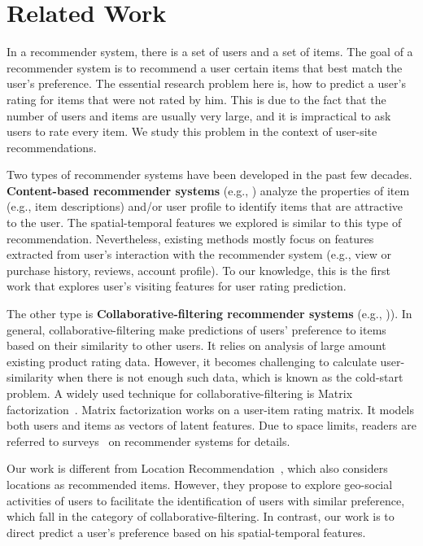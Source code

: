 
\section{Related Work}\label{sec:rw}

In a recommender system, there is a set of users and a set of items. The goal of a recommender system is to recommend a user certain items that best match the user's preference. The essential research problem here is, how to predict a user's rating for items that were not rated by him. This is due to the fact that the number of users and items are usually very large, and it is impractical to ask users to rate every item. We study this problem in the context of user-site recommendations.

Two types of recommender systems have been developed in the past few decades. \textbf{Content-based recommender systems} (e.g., \cite{contentbasedLang95,contentbasedPazzani97}) analyze the properties of item (e.g., item descriptions) and/or user profile to identify items that are attractive to the user. The spatial-temporal features we explored is similar to this type of recommendation. Nevertheless, existing methods mostly focus on features extracted from user's interaction with the recommender system (e.g., view or purchase history, reviews, account profile). To our knowledge, this is the first work that explores user's visiting features for user rating prediction. 

The other type is \textbf{Collaborative-filtering recommender systems} (e.g., \cite{userUserRec94,amazonRecommendation,davidson2010youtube,MFRec09})). In general, collaborative-filtering make predictions of users' preference to items based on their similarity to other users. It relies on analysis of large amount existing product rating data. However, it becomes challenging to calculate user-similarity when there is not enough such data, which is known as the cold-start problem. A widely used technique for collaborative-filtering is Matrix factorization~\cite{koren2009matrix}. Matrix factorization works on a user-item rating matrix. It models both users and items as vectors of latent features. Due to space limits, readers are referred to surveys~\cite{RecSurveyTKDE05, RecSysSurvey13} on recommender systems for details. 

Our work is different from Location Recommendation~\cite{ye2010location,wang2013location}, which also considers locations as recommended items. However, they propose to explore geo-social activities of users to facilitate the identification of users with similar preference, which fall in the category of collaborative-filtering. In contrast, our work is to direct predict a user's preference based on his spatial-temporal features.
